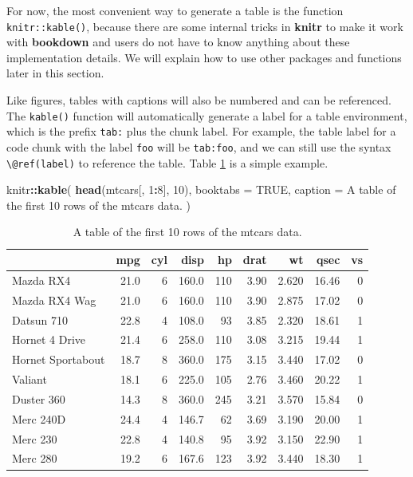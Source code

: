 \documentclass[
  12pt,
]{krantz}
\newenvironment{Shaded}{\begin{snugshade}}{\end{snugshade}}
\newcommand{\AttributeTok}[1]{\textcolor[rgb]{0.13,0.29,0.53}{#1}}
\newcommand{\ConstantTok}[1]{\textcolor[rgb]{0.56,0.35,0.01}{#1}}
\newcommand{\DecValTok}[1]{\textcolor[rgb]{0.00,0.00,0.81}{#1}}
\newcommand{\FunctionTok}[1]{\textcolor[rgb]{0.13,0.29,0.53}{\textbf{#1}}}
\newcommand{\NormalTok}[1]{#1}
\newcommand{\SpecialCharTok}[1]{\textcolor[rgb]{0.81,0.36,0.00}{\textbf{#1}}}
\newcommand{\StringTok}[1]{\textcolor[rgb]{0.31,0.60,0.02}{#1}}
\theoremstyle{definition}
\theoremstyle{definition}
\theoremstyle{definition}
\theoremstyle{definition}
\theoremstyle{remark}
\begin{document}
For now, the most convenient way to generate a table is the function \texttt{knitr::kable()}, because there are some internal tricks in \textbf{knitr} to make it work with \textbf{bookdown} and users do not have to know anything about these implementation details. We will explain how to use other packages and functions later in this section.

Like figures, tables with captions will also be numbered and can be referenced. The \texttt{kable()} function will automatically generate a label for a table environment, which is the prefix \texttt{tab:} plus the chunk label. For example, the table label for a code chunk with the label \texttt{foo} will be \texttt{tab:foo}, and we can still use the syntax \texttt{\textbackslash{}@ref(label)} to reference the table. Table \ref{tab:table-single} is a simple example.

\begin{Shaded}
\begin{Highlighting}[]
\NormalTok{knitr}\SpecialCharTok{::}\FunctionTok{kable}\NormalTok{(}
  \FunctionTok{head}\NormalTok{(mtcars[, }\DecValTok{1}\SpecialCharTok{:}\DecValTok{8}\NormalTok{], }\DecValTok{10}\NormalTok{), }\AttributeTok{booktabs =} \ConstantTok{TRUE}\NormalTok{,}
  \AttributeTok{caption =} \StringTok{\textquotesingle{}A table of the first 10 rows of the mtcars data.\textquotesingle{}}
\NormalTok{)}
\end{Highlighting}
\end{Shaded}

\begin{table}

\caption{\label{tab:table-single}A table of the first 10 rows of the mtcars data.}
\centering
\begin{tabular}[t]{lrrrrrrrr}
\toprule
  & mpg & cyl & disp & hp & drat & wt & qsec & vs\\
\midrule
Mazda RX4 & 21.0 & 6 & 160.0 & 110 & 3.90 & 2.620 & 16.46 & 0\\
Mazda RX4 Wag & 21.0 & 6 & 160.0 & 110 & 3.90 & 2.875 & 17.02 & 0\\
Datsun 710 & 22.8 & 4 & 108.0 & 93 & 3.85 & 2.320 & 18.61 & 1\\
Hornet 4 Drive & 21.4 & 6 & 258.0 & 110 & 3.08 & 3.215 & 19.44 & 1\\
Hornet Sportabout & 18.7 & 8 & 360.0 & 175 & 3.15 & 3.440 & 17.02 & 0\\
\addlinespace
Valiant & 18.1 & 6 & 225.0 & 105 & 2.76 & 3.460 & 20.22 & 1\\
Duster 360 & 14.3 & 8 & 360.0 & 245 & 3.21 & 3.570 & 15.84 & 0\\
Merc 240D & 24.4 & 4 & 146.7 & 62 & 3.69 & 3.190 & 20.00 & 1\\
Merc 230 & 22.8 & 4 & 140.8 & 95 & 3.92 & 3.150 & 22.90 & 1\\
Merc 280 & 19.2 & 6 & 167.6 & 123 & 3.92 & 3.440 & 18.30 & 1\\
\bottomrule
\end{tabular}
\end{table}
\end{document}
